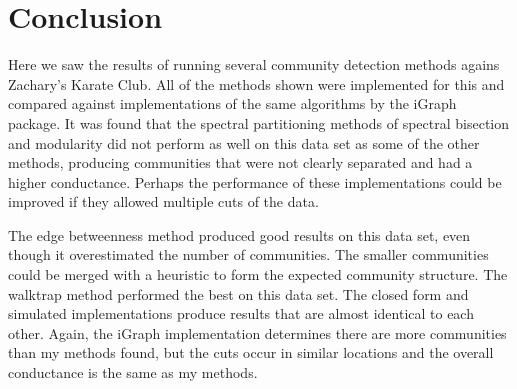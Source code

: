 \documentclass{article}
\begin{document}
\section{Conclusion}
Here we saw the results of running several community detection methods agains Zachary's Karate Club. All of the methods shown were implemented for this and compared against implementations of the same algorithms by the iGraph package. It was found that the spectral partitioning methods of spectral bisection and modularity did not perform as well on this data set as some of the other methods, producing communities that were not clearly separated and had a higher conductance. Perhaps the performance of these implementations could be improved if they allowed multiple cuts of the data.
\par
The edge betweenness method produced good results on this data set, even though it overestimated the number of communities. The smaller communities could be merged with a heuristic to form the expected community structure. The walktrap method performed the best on this data set. The closed form and simulated implementations produce results that are almost identical to each other. Again, the iGraph implementation determines there are more communities than my methods found, but the cuts occur in similar locations and the overall conductance is the same as my methods.

\newpage



\newpage
\end{document}
